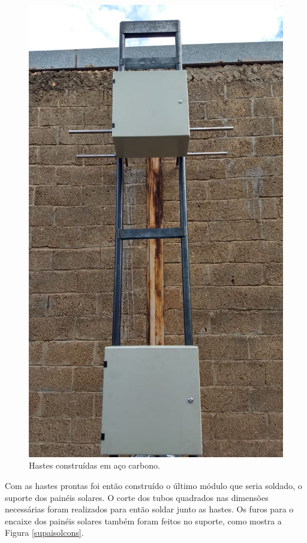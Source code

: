 \begin{figure}[H]
	\centering
    \includegraphics[keepaspectratio=true,scale=0.25]{figuras/estrutura_completa}
    \caption{Hastes construídas em aço carbono.}
    \label{hastescons}
\end{figure}

Com as hastes prontas foi então construído o último módulo que seria soldado, o suporte dos painéis solares. O corte dos tubos quadrados nas dimensões necessárias foram realizados para então soldar junto as hastes. Os furos para o encaixe dos painéis solares também foram feitos no suporte, como mostra a Figura \ref{supaisolcons}.

